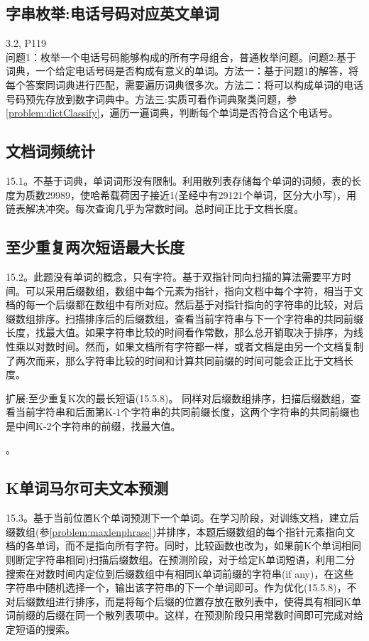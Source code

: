 \subsection{字串枚举:电话号码对应英文单词}
\cite{bop}3.2, \cite{pie}P119\\
问题1：枚举一个电话号码能够构成的所有字母组合，普通枚举问题。问题2:基于词典，一个给定电话号码是否构成有意义的单词。方法一：基于问题1的解答，将每个答案同词典进行匹配，需要遍历词典很多次。方法二：将可以构成单词的电话号码预先存放到数字词典中。方法三:实质可看作词典聚类问题，参\ref{problem:dictClassify}，遍历一遍词典，判断每个单词是否符合这个电话号。

\subsection{文档词频统计}
\cite{pp}15.1。不基于词典，单词词形没有限制。利用散列表存储每个单词的词频，表的长度为质数29989，使哈希载荷因子接近1(圣经中有29121个单词，区分大小写)，用链表解决冲突。每次查询几乎为常数时间。总时间正比于文档长度。

\subsection{至少重复两次短语最大长度}
\cite{pp}15.2。此题没有单词的概念，只有字符。基于双指针同向扫描的算法需要平方时间。可以采用后缀数组，数组中每个元素为指针，指向文档中每个字符，相当于文档的每一个后缀都在数组中有所对应。然后基于对指针指向的字符串的比较，对后缀数组排序。扫描排序后的后缀数组，查看当前字符串与下一个字符串的共同前缀长度，找最大值。如果字符串比较的时间看作常数，那么总开销取决于排序，为线性乘以对数时间。然而，如果文档所有字符都一样，或者文档是由另一个文档复制了两次而来，那么字符串比较的时间和计算共同前缀的时间可能会正比于文档长度。

扩展:至少重复K次的最长短语(\cite{pp}15.5.8)。 同样对后缀数组排序，扫描后缀数组，查看当前字符串和后面第K-1个字符串的共同前缀长度，这两个字符串的共同前缀也是中间K-2个字符串的前缀，找最大值。

\label{problem:maxlenphrase}。

\subsection{K单词马尔可夫文本预测}
\cite{pp}15.3。基于当前位置K个单词预测下一个单词。在学习阶段，对训练文档，建立后缀数组(参\ref{problem:maxlenphrase})并排序，本题后缀数组的每个指针元素指向文档的各单词，而不是指向所有字符。同时，比较函数也改为，如果前K个单词相同则断定字符串相同)扫描后缀数组。在预测阶段，对于给定K单词短语，利用二分搜索在对数时间内定位到后缀数组中有相同K单词前缀的字符串(if any)，在这些字符串中随机选择一个，输出该字符串的下一个单词即可。作为优化(\cite{pp}15.5.8)，不对后缀数组进行排序，而是将每个后缀的位置存放在散列表中，使得具有相同K单词前缀的后缀在同一个散列表项中。这样，在预测阶段只用常数时间即可完成对给定短语的搜索。 


